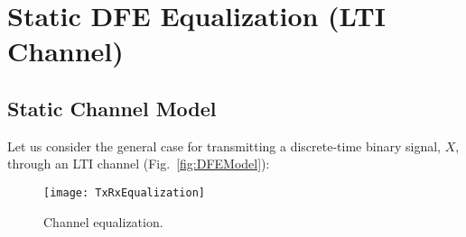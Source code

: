 %
%
\section{Static DFE Equalization (LTI Channel)}
%
\subsection{Static Channel Model}
\par Let us consider the general case for transmitting a discrete-time binary signal, $X$, through an LTI channel (Fig.~\ref{fig:DFEModel}):
\begin{figure}[!ht]
	\centering
	\texttt{[image: TxRxEqualization]}
	\caption{Channel equalization.}
\label{fig:TxRxEqualization}%
\end{figure}
%
